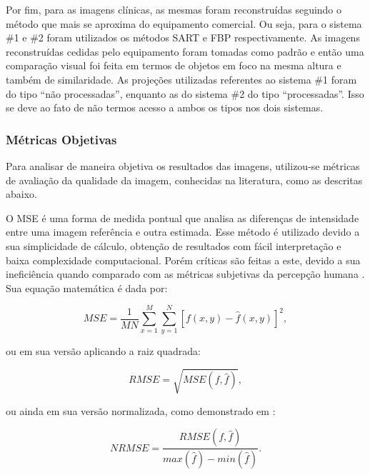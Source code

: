 Por fim, para as imagens clínicas, as mesmas foram reconstruídas seguindo o método que mais se aproxima do equipamento comercial. Ou seja, para o sistema \#1 e \#2 foram utilizados os métodos \acs{SART} e \acs{FBP} respectivamente. As imagens reconstruídas cedidas pelo equipamento foram tomadas como padrão e então uma comparação visual foi feita em termos de objetos em foco na mesma altura e também de similaridade. As projeções utilizadas referentes ao sistema \#1 foram do tipo ``não processadas'', enquanto as do sistema \#2 do tipo ``processadas''. Isso se deve ao fato de não termos acesso a ambos os tipos nos dois sistemas.  


\subsubsection{Métricas Objetivas} 

Para analisar de maneira objetiva os resultados das imagens, utilizou-se métricas de avaliação da qualidade da imagem, conhecidas na literatura, como as descritas abaixo.

O  \acs{MSE} é uma forma de medida pontual que analisa as diferenças de intensidade entre uma imagem referência e outra estimada. Esse método é utilizado devido a sua simplicidade de cálculo, obtenção de resultados com fácil interpretação e baixa complexidade computacional. Porém críticas são feitas a este, devido a sua ineficiência quando comparado com as métricas subjetivas da percepção humana \cite{gonzalez2008digital,wang2004image}. Sua equação matemática é dada por:

\begin{equation}
MSE = \dfrac{1}{MN} \sum_{x=1}^{M} \sum_{y=1}^{N} [f(x,y) - \hat{f}(x,y)]^{2},
\label{eq:eqCap4MSE}
\end{equation} 

\noindent ou em sua versão aplicando a raiz quadrada:

\begin{equation}
RMSE = \sqrt{MSE(f,\hat{f})},
\label{eq:eqCap4RMSE}
\end{equation}
 
\noindent ou ainda em sua versão normalizada, como demonstrado em :

\begin{equation}
NRMSE = \dfrac{RMSE(f,\hat{f})}{max(\hat{f}) - min(\hat{f})}.
\label{eq:eqCap4NRMSE}
\end{equation}

%



